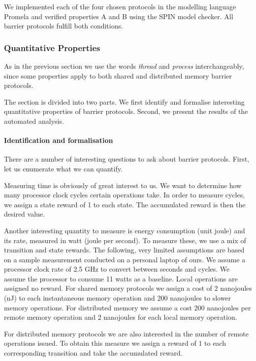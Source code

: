 \documentclass[a4paper, 10pt]{article}
\begin{document}
We implemented each of the four chosen protocols in the modelling language Promela and verified properties A and B using the SPIN model checker.
All barrier protocols fulfill both conditions.

\subsubsection{Quantitative Properties}
\label{sssec:analysis-modelchecking-quantitative-properties}
As in the previous section we use the words \emph{thread} and \emph{process} interchangeably, since some properties apply to both shared and distributed memory barrier protocols.

The section is divided into two parts. We first identify and formalise interesting quantitative properties of barrier protocols. Second, we present the results of the automated analysis.

\paragraph{Identification and formalisation}
\label{ssssec:analysis-modelchecking-quantitative-properties-identification}
There are a number of interesting questions to ask about barrier protocols. First, let us enumerate what we can quantify.

Measuring time is obviously of great interest to us. We want to determine how many processor clock cycles certain operations take. In order to measure cycles, we assign a state reward of 1 to each state. The accumulated reward is then the desired value.

Another interesting quantity to measure is energy consumption (unit joule) and its rate, measured in watt (joule per second).
To measure these, we use a mix of transition and state rewards.
The following, very limited assumptions are based on a sample measurement conducted on a personal laptop of ours.
We assume a processor clock rate of 2.5 GHz to convert between seconds and cycles.
We assume the processor to consume 11 watts as a baseline.
Local operations are assigned no reward.
For shared memory protocols we assign a cost of 2 nanojoules (nJ) to each instantaneous memory operation and 200 nanojoules to slower memory operations.
For distributed memory we assume a cost 200 nanojoules per remote memory operation and 2 nanojoules for each local memory operation.

For distributed memory protocols we are also interested in the number of remote operations issued. To obtain this measure we assign a reward of 1 to each corresponding transition and take the accumulated reward.
\end{document}
